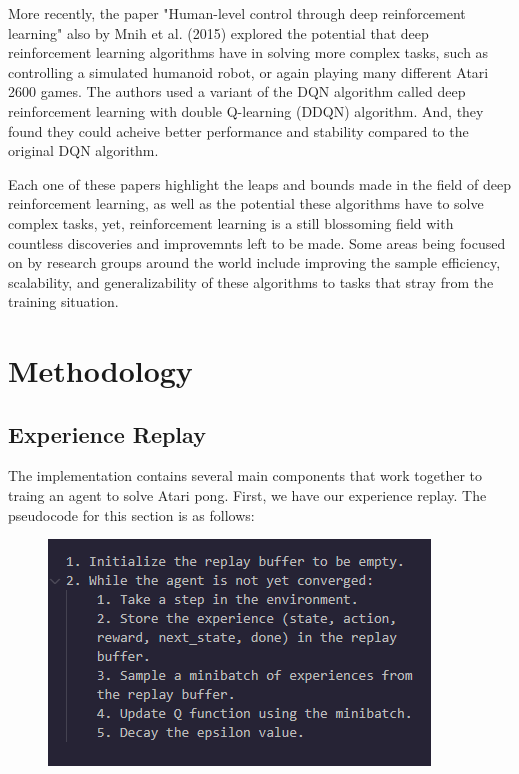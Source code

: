 \documentclass[12pt, a4paper, twocolumn]{article} %
\begin{document}
More recently, the paper "Human-level control through deep reinforcement learning" also by Mnih et al. (2015) explored the potential that deep reinforcement learning algorithms have in solving more complex tasks, such as controlling a simulated humanoid robot, or again playing many different Atari 2600 games. The authors used a variant of the DQN algorithm called deep reinforcement learning with double Q-learning (DDQN) algorithm. And, they found they could acheive better performance and stability compared to the original DQN algorithm.

Each one of these papers highlight the leaps and bounds made in the field of deep reinforcement learning, as well as the potential these algorithms have to solve complex tasks, yet, reinforcement learning is a still blossoming field with countless discoveries and improvemnts left to be made. Some areas being focused on by research groups around the world include improving the sample efficiency, scalability, and generalizability of these algorithms to tasks that stray from the training situation.


\section{Methodology}

\subsection{Experience Replay}
The implementation contains several main components that work together to traing an agent to solve Atari pong. First, we have our experience replay. The pseudocode for this section is as follows:

\begin{figure}[H]
	\includegraphics[width=\linewidth]{experience_replay_pseudocode.PNG} %
\end{figure}
\end{document}

